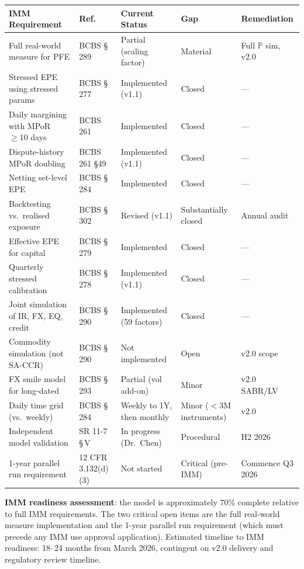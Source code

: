 \documentclass[11pt,a4paper]{article}
\begin{document}
\begin{longtable}{@{}lllll@{}}
\toprule
\textbf{IMM Requirement} & \textbf{Ref.} & \textbf{Current Status} & \textbf{Gap} & \textbf{Remediation} \\
\midrule
\endhead
\bottomrule
\endfoot
Full real-world measure for PFE
  & BCBS \S\,289
  & Partial (scaling factor)
  & Material
  & Full $\mathbb{P}$ sim, v2.0 \\
Stressed EPE using stressed params
  & BCBS \S\,277
  & Implemented (v1.1)
  & Closed
  & --- \\
Daily margining with MPoR $\geq 10$ days
  & BCBS 261
  & Implemented
  & Closed
  & --- \\
Dispute-history MPoR doubling
  & BCBS 261 \S49
  & Implemented (v1.1)
  & Closed
  & --- \\
Netting set-level EPE
  & BCBS \S\,284
  & Implemented
  & Closed
  & --- \\
Backtesting vs.\ realised exposure
  & BCBS \S\,302
  & Revised (v1.1)
  & Substantially closed
  & Annual audit \\
Effective EPE for capital
  & BCBS \S\,279
  & Implemented
  & Closed
  & --- \\
Quarterly stressed calibration
  & BCBS \S\,278
  & Implemented (v1.1)
  & Closed
  & --- \\
Joint simulation of IR, FX, EQ, credit
  & BCBS \S\,290
  & Implemented (59 factors)
  & Closed
  & --- \\
Commodity simulation (not SA-CCR)
  & BCBS \S\,290
  & Not implemented
  & Open
  & v2.0 scope \\
FX smile model for long-dated
  & BCBS \S\,293
  & Partial (vol add-on)
  & Minor
  & v2.0 SABR/LV \\
Daily time grid (vs.\ weekly)
  & BCBS \S\,284
  & Weekly to 1Y, then monthly
  & Minor ($<3$M instruments)
  & v2.0 \\
Independent model validation
  & SR 11-7 \S\,V
  & In progress (Dr.\ Chen)
  & Procedural
  & H2 2026 \\
1-year parallel run requirement
  & 12 CFR 3.132(d)(3)
  & Not started
  & Critical (pre-IMM)
  & Commence Q3 2026 \\
\end{longtable}

\textbf{IMM readiness assessment}: the model is approximately 70\% complete
relative to full IMM requirements. The two critical open items are the
full real-world measure implementation and the 1-year parallel run requirement
(which must precede any IMM use approval application). Estimated timeline to
IMM readiness: 18--24 months from March 2026, contingent on v2.0 delivery
and regulatory review timeline.
\end{document}
